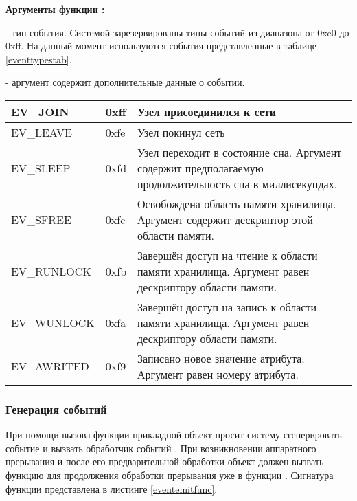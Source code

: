 {\bfseries Аргументы функции :}
\begin{enumerate}
{\itshape
\item {} - тип события. Системой \zigzag зарезервированы типы событий из диапазона от 0xe0 до 0xff. На 
данный момент используются события представленные в таблице \ref{eventtypestab}.
\item {} - аргумент содержит дополнительные данные о событии.
}
\end{enumerate}

\tabletail{\hline}
\tablelasttail{\hline}
\begin{supertabular}{|l|p{2cm}|p{9cm}|}
\label{eventtypestab}

   EV\_JOIN & 0xff & Узел присоединился к сети \\\hline
   EV\_LEAVE & 0xfe & Узел покинул сеть \\\hline
   EV\_SLEEP & 0xfd & Узел переходит в состояние сна. Аргумент  содержит предполагаемую продолжительность сна в миллисекундах. \\\hline
   EV\_SFREE & 0xfc & Освобождена область памяти хранилища. Аргумент  содержит дескриптор этой области памяти. \\\hline
   EV\_RUNLOCK & 0xfb & Завершён доступ на чтение к области памяти хранилища. Аргумент  равен дескриптору области памяти. \\\hline
   EV\_WUNLOCK & 0xfa & Завершён доступ на запись к области памяти хранилища. Аргумент  равен дескриптору области памяти. \\\hline
   EV\_AWRITED & 0xf9 & Записано новое значение атрибута. Аргумент  равен номеру атрибута. \\\hline

\end{supertabular}


\subsubsection{Генерация событий }

При помощи вызова функции  прикладной объект просит систему \zigzag сгенерировать событие и вызвать обработчик
событий . При возникновении аппаратного прерывания и после его предварительной обработки объект должен вызвать
функцию  для продолжения обработки прерывания уже в функции . Сигнатура функции 
представлена в листинге \ref{eventemitfunc}.

